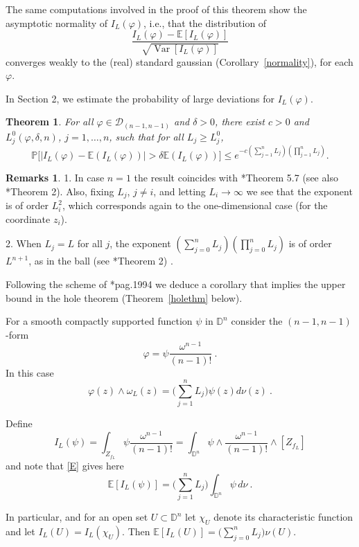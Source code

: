 \documentclass[12pt,twoside,final,amsfonts]{amsart}
\theoremstyle{plain}
\newtheorem{theorem}{Theorem}
\theoremstyle{definition}
\newtheorem*{remarks*}{Remarks}
\theoremstyle{definition}
\begin{document}
The same computations involved in the proof of this theorem show the asymptotic normality of $I_L(\varphi)$, i.e., that the distribution of
\[
\frac{I_L(\varphi)-{\mathbb{E}}[I_L(\varphi)]}{\sqrt{{\operatorname{Var}} [I_L(\varphi)]}}
\]
converges weakly to the (real) standard gaussian (Corollary~\ref{normality}), for each $\varphi$.

In Section 2, we estimate the probability of large deviations for $I_L(\varphi)$.

\begin{theorem}\label{smoothlargedeviations}
For all $\varphi\in \mathcal D_{(n-1,n-1)}$ and $\delta>0$, there exist $c>0$ and $L_j^0(\varphi,\delta,n)$, $j=1,\dots,n$, such that for all $L_j\geq L_j^0$,
\[
\mathbb P\bigl[|I_L(\varphi)-{\mathbb{E}}(I_L(\varphi))|>\delta {\mathbb{E}}(I_L(\varphi))\bigr]\leq e^{-c{(\sum_{j=1}^n L_j)(\prod_{j=1}^n L_j)}}.
\]
\end{theorem}

\begin{remarks*}
 1. In case $n=1$ the result coincides with \cite{Bu-T13}*{Theorem 5.7} (see also \cite{BMP}*{Theorem 2}). Also, fixing $L_j$, $j\neq i$, and letting $L_i\to\infty$ we see that the exponent is of order $L_i^2$, which corresponds again to the one-dimensional case (for the coordinate $z_i$).

 2. When $L_j=L$ for all $j$, the exponent $(\sum_{j=0}^n L_j)(\prod_{j=0}^n L_j)$ is of order $L^{n+1}$, as  in the ball (see \cite{BMP}*{Theorem 2}) .
  
\end{remarks*}

Following the scheme of \cite{SZZ}*{pag.1994} we deduce a corollary that implies the upper bound in the hole theorem (Theorem~\ref{holethm} below). 

For a smooth compactly supported function $\psi$ in ${\mathbb{D}}^n$ consider the $(n-1,n-1)$-form
\[
 \varphi=\psi \frac{\omega^{n-1}}{(n-1)!}\ .
\]
In this case
\[
 \varphi (z) \wedge \omega_L (z) =\bigl({\sum_{j=1}^n L_j}\bigr) \psi(z) d\nu(z)\ .
\]

Define
\[
 I_L(\psi)=\int_{Z_{f_L}}\psi\frac{\omega^{n-1}}{(n-1)!} =\int_{\mathbb D^n} \psi \wedge \frac{\omega^{n-1}}{(n-1)!} \wedge [Z_{f_L}]
\]
and note that \eqref{E} gives here
\[
 {\mathbb{E}}[I_L(\psi)]=\bigl({\sum_{j=1}^n L_j}\bigr) \int_{{\mathbb{D}}^n} \psi\, d\nu\ .
\]

In particular, and for an open set $U\subset{\mathbb{D}}^n$ let $\chi_U$ denote its characteristic function and let  $I_L(U)=I_L(\chi_U)$. Then ${\mathbb{E}}[I_L(U)]=\bigl(\sum_{j=0}^n L_j\bigr) \nu(U)$. 
\end{document}
